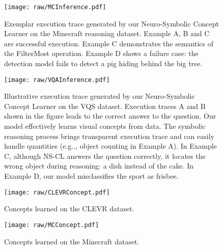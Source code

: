 \documentclass{article} \usepackage{iclr2019_conference,times}
\makeatletter
\DeclareRobustCommand\onedot{\futurelet\@let@token\@onedot}
\def\@onedot{\ifx\@let@token.\else.\null\fi\xspace}
\def\eg{e.g\onedot} \def\Eg{E.g\onedot}
\newcommand{\model}{NS-CL\xspace}
\makeatother
\begin{document}
{\begin{figure}[ht]
    \centering
    \texttt{[image: raw/MCInference.pdf]}
    \caption{Exemplar execution trace generated by our Neuro-Symbolic Concept Learner on the Minecraft reasoning dataset. Example A, B and C are successful execution. Example C demonstrates the semantics of the FilterMost operation. Example D shows a failure case: the detection model fails to detect a pig hiding behind the big tree.}
    \label{fig:vis:mc}
\end{figure}

\begin{figure}[ht]
    \centering
    \texttt{[image: raw/VQAInference.pdf]}
    \caption{Illustrative execution trace generated by our Neuro-Symbolic Concept Learner on the VQS dataset. Execution traces A and B shown in the figure leads to the correct answer to the question. Our model effectively learns visual concepts from data. The symbolic reasoning process brings transparent execution trace and can easily handle quantities (\eg, object counting in Example A). 
In Example C, although \model answers the question correctly, it locates the wrong object during reasoning: a dish instead of the cake. In Example D, our model misclassifies the sport as frisbee.
    }
    \label{fig:vis:vqs:1}
\end{figure}

\begin{figure}[ht]
    \centering
    \texttt{[image: raw/CLEVRConcept.pdf]}
    \caption{Concepts learned on the CLEVR dataset.}
    \label{fig:vis:clevr:concept}
\end{figure}

\begin{figure}[ht]
    \centering
    \texttt{[image: raw/MCConcept.pdf]}
    \caption{Concepts learned on the Minecraft dataset.}
    \label{fig:vis:mc:concept}
\end{figure}
} 
\end{document}
